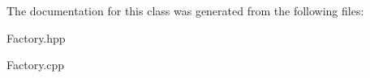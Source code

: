 The documentation for this class was generated from the following files\-:\begin{DoxyCompactItemize}
\item 
Factory.\-hpp\item 
Factory.\-cpp\end{DoxyCompactItemize}
